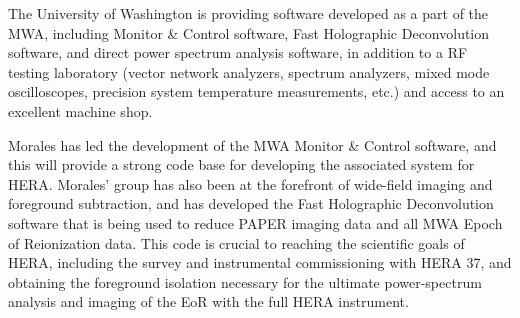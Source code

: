 \documentclass[11pt]{article}
\begin{document}
The University of Washington is providing software developed as a part of the
MWA, including Monitor \& Control software, Fast Holographic Deconvolution
software, and direct power spectrum analysis software, in addition to a RF
testing laboratory (vector network analyzers, spectrum analyzers, mixed mode
oscilloscopes, precision system temperature measurements, etc.) and access to
an excellent machine shop.

Morales has led the development of the MWA Monitor \& Control software, and this
will provide a strong code base for developing the associated system for HERA.
Morales' group has also been at the forefront of wide-field imaging and
foreground subtraction, and has developed the Fast Holographic Deconvolution
software that is being used to reduce PAPER imaging data and all MWA Epoch of
Reionization data. This code is crucial to reaching the scientific goals of
HERA, including the survey and instrumental commissioning with HERA 37, and
obtaining the foreground isolation necessary for the ultimate power-spectrum
analysis and imaging of the EoR with the full HERA instrument.
\end{document}
